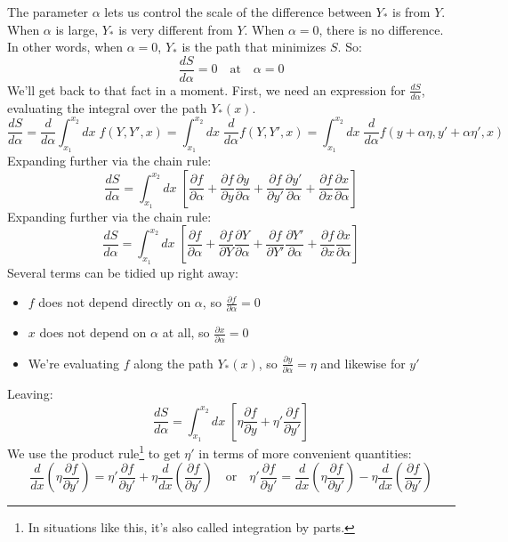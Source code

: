 \documentclass[10pt]{article}
\begin{document}
The parameter $\alpha$ lets us control the scale of the difference between $Y_*$ is from $Y$. When $\alpha$ is large, $Y_*$ is very different from $Y$. When $\alpha=0$, there is no difference. In other words, when $\alpha=0$, $Y_*$ is the path that minimizes $S$. So:
$$
\frac{dS}{d\alpha} =0 \quad \textrm{at} \quad \alpha=0
$$
We'll get back to that fact in a moment. First, we need an expression for $\frac{dS}{d\alpha}$, evaluating the integral over the path $Y_*(x)$.
$$
\frac{dS}{d\alpha} =
\frac{d}{d\alpha} \displaystyle\int_{x_1}^{x_2} dx \; f(Y, Y', x) =
\displaystyle\int_{x_1}^{x_2} dx \; \frac{d}{d\alpha} f(Y, Y', x) =
\displaystyle\int_{x_1}^{x_2} dx \; \frac{d}{d\alpha} f(y + \alpha \eta, y' + \alpha \eta', x)
$$
Expanding further via the chain rule:
$$
\frac{dS}{d\alpha} = \displaystyle\int_{x_1}^{x_2} dx \; \left[
    \frac{\partial f}{\partial \alpha} +
    \frac{\partial f}{\partial y} \frac{\partial y}{\partial \alpha} +
    \frac{\partial f}{\partial y'} \frac{\partial y'}{\partial \alpha} +
    \frac{\partial f}{\partial x} \frac{\partial x}{\partial \alpha}
\right]
$$
Expanding further via the chain rule:
$$
\frac{dS}{d\alpha} = \displaystyle\int_{x_1}^{x_2} dx \; \left[
    \frac{\partial f}{\partial \alpha} +
    \frac{\partial f}{\partial Y} \frac{\partial Y}{\partial \alpha} +
    \frac{\partial f}{\partial Y'} \frac{\partial Y'}{\partial \alpha} +
    \frac{\partial f}{\partial x} \frac{\partial x}{\partial \alpha}
\right]
$$
Several terms can be tidied up right away:
\begin{itemize}
    \item $f$ does not depend directly on $\alpha$, so $\frac{\partial f}{\partial \alpha} = 0$
    \item $x$ does not depend on $\alpha$ at all, so $\frac{\partial x}{\partial \alpha} = 0$
    \item We're evaluating $f$ along the path $Y_*(x)$, so $\frac{\partial y}{\partial \alpha} = \eta$ and likewise for $y'$
\end{itemize}
Leaving:
$$
\frac{dS}{d\alpha} = \displaystyle\int_{x_1}^{x_2} dx \; \left[ \eta \frac{\partial f}{\partial y} + \eta' \frac{\partial f}{\partial y'} \right]
$$
We use the product rule\footnote{In situations like this, it's also called integration by parts.} to get $\eta'$ in terms of more convenient quantities: 
$$
\frac{d}{dx} \left( \eta \frac{\partial f}{\partial y'} \right) = \eta' \frac{\partial f}{\partial y'} + \eta \frac{d}{dx} \left( \frac{\partial f}{\partial y'} \right)
\quad \mathrm{or} \quad 
\eta' \frac{\partial f}{\partial y'} = \frac{d}{dx} \left( \eta \frac{\partial f}{\partial y'} \right) - \eta \frac{d}{dx} \left( \frac{\partial f}{\partial y'} \right) 
$$
\end{document}

